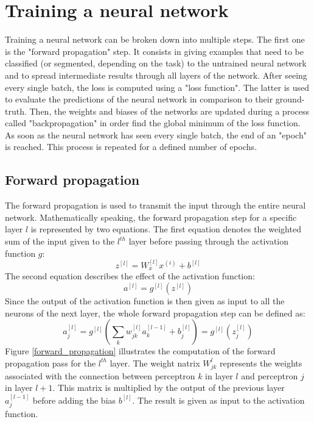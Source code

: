 \section{Training a neural network}
\label{training_a_neural_network}
Training a neural network can be broken down into multiple steps. The first one is the "forward propagation" step. It consists in giving examples that need to be classified (or segmented, depending on the task) to the untrained neural network and to spread intermediate results through all layers of the network. %
After seeing every single batch, the loss is computed using a "loss function". The latter is used to evaluate the predictions of the neural network in comparison to their ground-truth. Then, the weights and biases of the networks are updated during a process called "backpropagation" in order find the global minimum of the loss function. As soon as the neural network has seen every single batch, the end of an "epoch" is reached. This process is repeated for a defined number of epochs.


\subsection{Forward propagation}
The forward propagation is used to transmit the input through the entire neural network. Mathematically speaking, the forward propagation step for a specific layer $l$ is represented by two equations. The first equation denotes the weighted sum of the input given to the $l^{th}$ layer before passing through the activation function $g$: 
\begin{equation}
z^{[l]} = W_{x}^{[l]}x^{(i)} + b^{[l]}
\end{equation}
The second equation describes the effect of the activation function:
\begin{equation}
a^{[l]} = g^{[l]}(z^{[l]})
\end{equation}
Since the output of the activation function is then given as input to all the neurons of the next layer, the whole forward propagation step can be defined as:
\begin{equation}
a_{j}^{[l]} = g^{[l]} (\sum_{k} w_{jk}^{[l]}a_{k}^{[l-1]} + b_{j}^{[l]}) = g^{[l]} (z_{j}^{[l]}) 
\end{equation}
Figure \ref{forward_propagation} illustrates the computation of the forward propagation pass for the $l^{th}$ layer. The weight natrix $W_{jk}^{l}$ represents the weights associated with the connection between perceptron $k$ in layer $l$ and perceptron $j$ in layer $l+1$. This matrix is multiplied by the output of the previous layer $a_{j}^{[l-1]}$ before adding the bias $b^{[l]}$. The result is given as input to the activation function.


